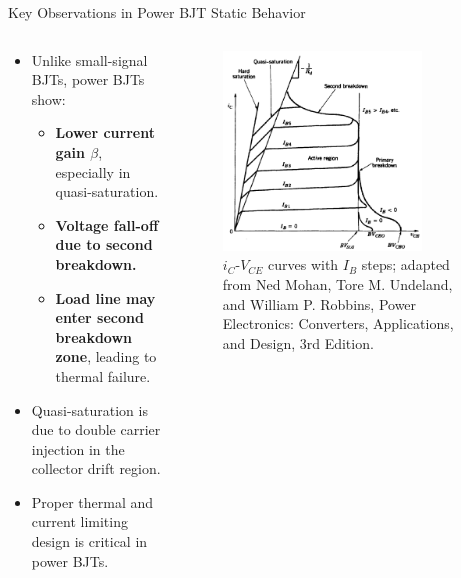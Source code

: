 \begin{frame}{Key Observations in Power BJT Static Behavior}
    \begin{columns}
    \begin{column}{0.6\textwidth}
    \begin{itemize}
        \item Unlike small-signal BJTs, power BJTs show:
        \begin{itemize}
            \item \textbf{Lower current gain $\beta$}, especially in quasi-saturation.
            \item \textbf{Voltage fall-off due to second breakdown.}
            \item \textbf{Load line may enter second breakdown zone}, leading to thermal failure.
        \end{itemize}
        \item Quasi-saturation is due to double carrier injection in the collector drift region.
        \item Proper thermal and current limiting design is critical in power BJTs.
    \end{itemize}
    \end{column}

    \begin{column}{0.4\textwidth}
    \begin{figure}
        \centering
        \includegraphics[width=0.8\textwidth]{fig/lec04/BJT_VI_Characteristics2.png}
        \caption{$i_C$-$V_{CE}$ curves with $I_B$ steps; adapted from Ned Mohan, Tore M. Undeland, and William P. Robbins, Power Electronics: Converters, Applications, and Design, 3rd Edition.}
    \end{figure}
    \end{column}
\end{columns}
\end{frame}



